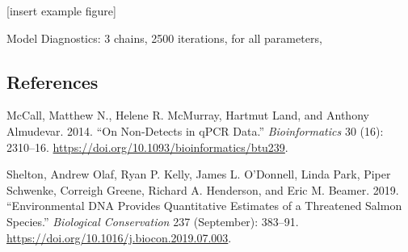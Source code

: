 \documentclass[
]{article}
\newlength{\cslhangindent}
\newlength{\cslentryspacingunit} %
\newenvironment{CSLReferences}[2] %
 {%
  \setlength{\parindent}{0pt}
  \ifodd #1
  \let\oldpar\par
  \def\par{\hangindent=\cslhangindent\oldpar}
  \fi
  \setlength{\parskip}{#2\cslentryspacingunit}
 }%
 {}
\begin{document}
{[}insert example figure{]}

Model Diagnostics: 3 chains, 2500 iterations, for all parameters,

\hypertarget{references}{%
\subsection*{References}\label{references}}

\hypertarget{refs}{}
\begin{CSLReferences}{1}{0}
\leavevmode{}%
McCall, Matthew N., Helene R. McMurray, Hartmut Land, and Anthony
Almudevar. 2014. {``On Non-Detects in qPCR Data.''}
\emph{Bioinformatics} 30 (16): 2310--16.
\url{https://doi.org/10.1093/bioinformatics/btu239}.

\leavevmode{}%
Shelton, Andrew Olaf, Ryan P. Kelly, James L. O'Donnell, Linda Park,
Piper Schwenke, Correigh Greene, Richard A. Henderson, and Eric M.
Beamer. 2019. {``Environmental DNA Provides Quantitative Estimates of a
Threatened Salmon Species.''} \emph{Biological Conservation} 237
(September): 383--91.
\url{https://doi.org/10.1016/j.biocon.2019.07.003}.

\end{CSLReferences}
\end{document}
